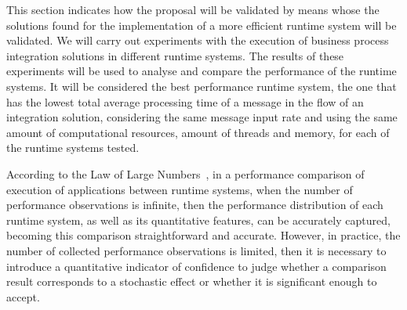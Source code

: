 \label{cap:validation}
\noindent 
This section indicates how the proposal will be validated by means whose the solutions found for the implementation of a more efficient runtime system will be validated. We will carry out experiments with the execution of business process integration solutions in different runtime systems. The results of these experiments will be used to analyse and compare the performance of the runtime systems. It will be considered the best performance runtime system, the one that has the lowest total average processing time of a message in the flow of an integration solution, considering the same message input rate and using the same amount of computational resources, amount of threads and memory, for each of the runtime systems tested.

According to the Law of Large Numbers~\cite{hoeffding1961}, in a performance comparison of execution of applications between runtime systems, when the number of performance observations is infinite, then the performance distribution of each runtime system, as well as its quantitative features, can be accurately captured, becoming this comparison straightforward and accurate. However, in practice, the number of collected performance observations is limited, then it is necessary to introduce a quantitative indicator of confidence to judge whether a comparison result corresponds to a stochastic effect or whether it is significant enough to accept.

